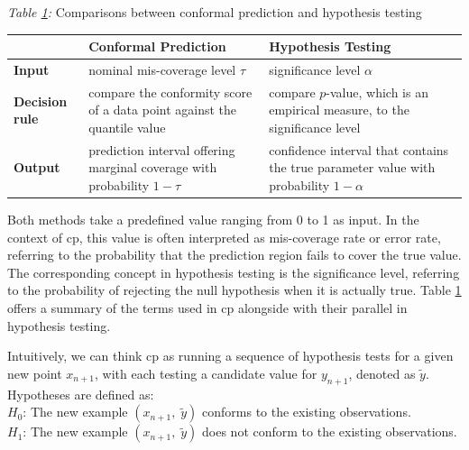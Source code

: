 \begin{table}[t]
    \centering
   	
 	{\small \textit{Table \ref{tab:cpht_comparison}:} Comparisons between conformal prediction and hypothesis testing}
	\vspace{0.7em}

    \renewcommand{\arraystretch}{1.2}
   	\begin{tabular}{| m{1.5cm} | m{6cm} | m{5.8cm} |}
    \hline
    &\textbf{Conformal Prediction} & \textbf{Hypothesis Testing} \\
    \hline
    \textbf{Input} & nominal mis-coverage level $\tau$ & significance level $\alpha$ \\
    \hline
    \textbf{Decision rule} & compare the conformity score of a data point against the quantile value & compare $p$-value, which is an empirical measure, to the significance level \\ 
    \hline
	\textbf{Output} & prediction interval offering marginal coverage with probability $1 - \tau$ & confidence interval that contains the true parameter value with probability $1 - \alpha$  \\
	\hline        		
    \end{tabular}
    \label{tab:cpht_comparison}
\end{table}
	  	
Both methods take a predefined value ranging from 0 to 1 as input. In the context of \gls{cp}, this value is often interpreted as mis-coverage rate or error rate, referring to the probability that the prediction region fails to cover the true value. The corresponding concept in hypothesis testing is the significance level, referring to the probability of rejecting the null hypothesis when it is actually true. Table \ref{tab:cpht_comparison} offers a summary of the terms used in \gls{cp} alongside with their parallel in hypothesis testing.

Intuitively, we can think \gls{cp} as running a sequence of hypothesis tests for a given new point $x_{n+1}$, with each testing a candidate value for $y_{n+1}$, denoted as $\tilde{y}$. Hypotheses are defined as: \\

\vspace{-0.3em}
\indent $H_0$: The new example $(x_{n+1}, \; \tilde{y})$ conforms to the existing observations. \\
\indent	$H_1$: The new example $(x_{n+1}, \; \tilde{y})$ does not conform to the existing observations. \\
\vspace{-0.3em}

